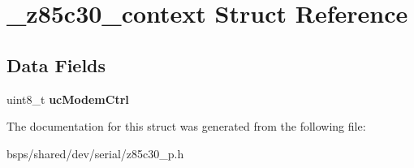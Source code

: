 \hypertarget{struct__z85c30__context}{}\section{\+\_\+z85c30\+\_\+context Struct Reference}
\label{struct__z85c30__context}
\subsection*{Data Fields}
\begin{DoxyCompactItemize}
\item 
\mbox{\label{struct__z85c30__context_af72fdb27d901300e71f82966fbfe184a}} 
uint8\+\_\+t {\bfseries uc\+Modem\+Ctrl}
\end{DoxyCompactItemize}


The documentation for this struct was generated from the following file\+:\begin{DoxyCompactItemize}
\item 
bsps/shared/dev/serial/z85c30\+\_\+p.\+h\end{DoxyCompactItemize}
